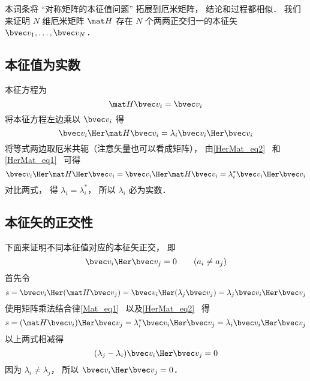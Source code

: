 

本词条将 “对称矩阵的本征值问题” 拓展到厄米矩阵， 结论和过程都相似． 我们来证明 $N$ 维厄米矩阵 $\mat H$ 存在 $N$ 个两两正交归一的本征矢 $\bvec v_1, \dots, \bvec v_N$．


\subsection{本征值为实数}
本征方程为
\begin{equation}
\mat H \bvec v_i = \bvec v_i
\end{equation}
将本征方程左边乘以 $\bvec v_i$ 得
\begin{equation}
\bvec v_i\Her \mat H \bvec v_i = \lambda_i \bvec v_i\Her \bvec v_i
\end{equation}
将等式两边取厄米共轭（注意矢量也可以看成矩阵）， 由\autoref{HerMat_eq2}~ 和\autoref{HerMat_eq1}~ 可得
\begin{equation}
\bvec v_i\Her \mat H\Her \bvec v_i = \bvec v_i\Her \mat H \bvec v_i = \lambda_i^* \bvec v_i\Her \bvec v_i
\end{equation}
对比两式， 得 $\lambda_i = \lambda_i^*$， 所以 $\lambda_i$ 必为实数．

\subsection{本征矢的正交性}
下面来证明不同本征值对应的本征矢正交， 即
\begin{equation}\label{HerEig_eq1}
\bvec v_i\Her \bvec v_j = 0 \qquad (a_i \ne a_j)
\end{equation}
首先令
\begin{equation}
s = \bvec v_i\Her (\mat H \bvec v_j) = \bvec v_i\Her (\lambda_j \bvec v_j) = \lambda_j \bvec v_i\Her \bvec v_j
\end{equation}
使用矩阵乘法结合律\autoref{Mat_eq1}~ 以及\autoref{HerMat_eq2}~ 得
\begin{equation}
s = (\mat H \bvec v_i)\Her \bvec v_j = \lambda_i^* \bvec v_i\Her \bvec v_j = \lambda_i \bvec v_i\Her \bvec v_j
\end{equation}
以上两式相减得 %
\begin{equation}
(\lambda_j - \lambda_i)\bvec v_i\Her \bvec v_j = 0
\end{equation}
因为 $\lambda_i \ne \lambda_j$， 所以 $\bvec v_i\Her \bvec v_j = 0$．

